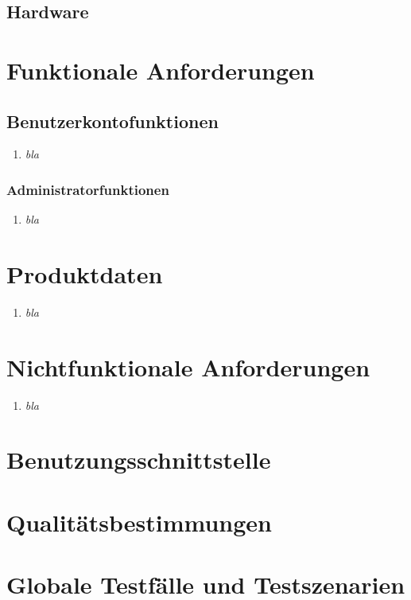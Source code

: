 \documentclass[parskip=full,11pt]{scrartcl}
\def\threedigits#1{%
  \ifnum#1<100 0\fi
  \ifnum#1<10 0\fi
  \number#1}
\begin{document}
\subsection{Hardware}


\section{Funktionale Anforderungen}
\subsection{Benutzerkontofunktionen}
\begin{enumerate}[label={\textbf{/F\protect\threedigits{\theenumi}}}, leftmargin=*]
\item \textit{bla}
\end{enumerate}

\subsubsection{Administratorfunktionen}
\begin{enumerate}[label={\textbf{/F\protect\threedigits{\theenumi}}}, leftmargin=*]
\item \textit{bla}
\end{enumerate}

\section{Produktdaten}
\begin{enumerate}[label={\textbf{/D\protect\threedigits{\theenumi}}}, leftmargin=*]
\item \textit{bla}
\end{enumerate}
\section{Nichtfunktionale Anforderungen}
\begin{enumerate}[label={\textbf{/NF\protect\threedigits{\theenumi}}}, leftmargin=*]
\item \textit{bla}
\end{enumerate}



\section{Benutzungsschnittstelle}

\section{Qualitätsbestimmungen}

\section{Globale Testfälle und Testszenarien}

\newpage
\printglossary	
\end{document}
